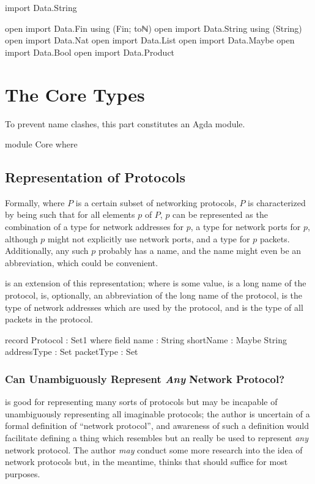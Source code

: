 \documentclass{report}
\begin{document}
\begin{code}
import Data.String

open import Data.Fin using (Fin; toℕ)
open import Data.String using (String)
open import Data.Nat
open import Data.List
open import Data.Maybe
open import Data.Bool
open import Data.Product
\end{code}

\part{The Core Types}
To prevent name clashes, this part constitutes an Agda module.

\begin{code}
module Core where
\end{code}

\chapter{Representation of Protocols}
Formally, where \(P\) is a certain subset of networking protocols, \(P\) is characterized by being such that for all elements \(p\) of \(P\), \(p\) can be represented as the combination of a type for network addresses for \(p\), a type for network ports for \(p\), although \(p\) might not explicitly use network ports, and a type for \(p\) packets.  Additionally, any such \(p\) probably has a name, and the name might even be an abbreviation, which could be convenient.

 is an extension of this representation; where  is some  value,   is a long name of the  protocol,   is, optionally, an abbreviation of the long name of the  protocol,   is the type of network addresses which are used by the  protocol, and   is the type of all packets in the  protocol.

\begin{code}
  record Protocol : Set1 where
    field
      name : String
      shortName : Maybe String
      addressType : Set
      packetType : Set
\end{code}

\section{Can  Unambiguously Represent \emph{Any} Network Protocol?}
 is good for representing many sorts of protocols but may be incapable of unambiguously representing all imaginable protocols; the author is uncertain of a formal definition of ``network protocol'', and awareness of such a definition would facilitate defining a thing which resembles  but an really be used to represent \emph{any} network protocol.  The author \emph{may} conduct some more research into the idea of network protocols but, in the meantime, thinks that  should suffice for most purposes.
\end{document}
